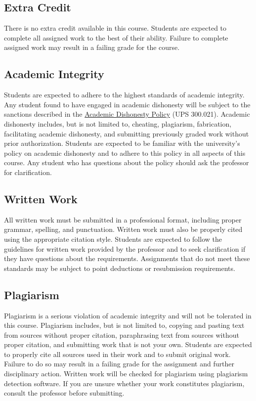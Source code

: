 \documentclass[11pt, letterpaper]{article}
\begin{document}
\subsection*{Extra Credit}
There is no extra credit available in this course. Students are expected to complete all assigned work to the best of their ability. Failure to complete assigned work may result in a failing grade for the course.

\subsection*{Academic Integrity}
Students are expected to adhere to the highest standards of academic integrity. Any student found to have engaged in academic dishonesty will be subject to the sanctions described in the \href{https://www.fullerton.edu/senate/publications_policies_resolutions/ups/UPS%20300/UPS%20300.021.pdf}{Academic Dishonesty Policy} (UPS 300.021). Academic dishonesty includes, but is not limited to, cheating, plagiarism, fabrication, facilitating academic dishonesty, and submitting previously graded work without prior authorization. Students are expected to be familiar with the university's policy on academic dishonesty and to adhere to this policy in all aspects of this course. Any student who has questions about the policy should ask the professor for clarification.

\subsection*{Written Work}
All written work must be submitted in a professional format, including proper grammar, spelling, and punctuation. Written work must also be properly cited using the appropriate citation style. Students are expected to follow the guidelines for written work provided by the professor and to seek clarification if they have questions about the requirements. Assignments that do not meet these standards may be subject to point deductions or resubmission requirements.

\subsection*{Plagiarism}
Plagiarism is a serious violation of academic integrity and will not be tolerated in this course. Plagiarism includes, but is not limited to, copying and pasting text from sources without proper citation, paraphrasing text from sources without proper citation, and submitting work that is not your own. Students are expected to properly cite all sources used in their work and to submit original work. Failure to do so may result in a failing grade for the assignment and further disciplinary action. Written work will be checked for plagiarism using plagiarism detection software. If you are unsure whether your work constitutes plagiarism, consult the professor before submitting.
\end{document}
